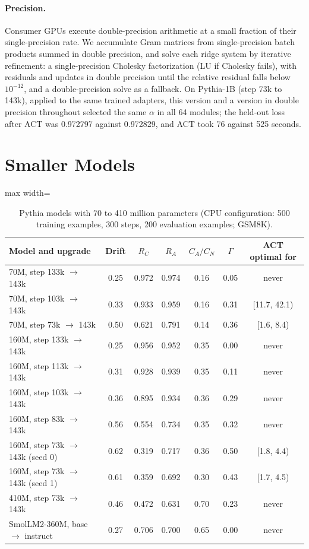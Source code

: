 \documentclass[preprint,12pt,authoryear]{elsarticle}
\begin{document}
\paragraph{Precision.} Consumer GPUs execute double-precision arithmetic at a small fraction of their single-precision rate. We accumulate Gram matrices from single-precision batch products summed in double precision, and solve each ridge system by iterative refinement: a single-precision Cholesky factorization (LU if Cholesky fails), with residuals and updates in double precision until the relative residual falls below $10^{-12}$, and a double-precision solve as a fallback. On Pythia-1B (step 73k to 143k), applied to the same trained adapters, this version and a version in double precision throughout selected the same $\alpha$ in all 64 modules; the held-out loss after ACT was 0.972797 against 0.972829, and ACT took 76 against 525 seconds.

\section{Smaller Models}\label{app:small}

\begin{table}[t]
\centering
\caption{Pythia models with 70 to 410 million parameters (CPU configuration: 500 training examples, 300 steps, 200 evaluation examples; GSM8K).}\label{tab:small}
\small
\begin{adjustbox}{max width=\textwidth}
\begin{tabular}{lcccccc}
\toprule
Model and upgrade & Drift & $R_C$ & $R_A$ & $C_A/C_N$ & $\Gamma$ & ACT optimal for\\
\midrule
70M, step 133k $\to$ 143k & 0.25 & 0.972 & 0.974 & 0.16 & 0.05 & never\\
70M, step 103k $\to$ 143k & 0.33 & 0.933 & 0.959 & 0.16 & 0.31 & [11.7, 42.1)\\
70M, step 73k $\to$ 143k & 0.50 & 0.621 & 0.791 & 0.14 & 0.36 & [1.6, 8.4)\\
160M, step 133k $\to$ 143k & 0.25 & 0.956 & 0.952 & 0.35 & 0.00 & never\\
160M, step 113k $\to$ 143k & 0.31 & 0.928 & 0.939 & 0.35 & 0.11 & never\\
160M, step 103k $\to$ 143k & 0.36 & 0.895 & 0.934 & 0.36 & 0.29 & never\\
160M, step 83k $\to$ 143k & 0.56 & 0.554 & 0.734 & 0.35 & 0.32 & never\\
160M, step 73k $\to$ 143k (seed 0) & 0.62 & 0.319 & 0.717 & 0.36 & 0.50 & [1.8, 4.4)\\
160M, step 73k $\to$ 143k (seed 1) & 0.61 & 0.359 & 0.692 & 0.30 & 0.43 & [1.7, 4.5)\\
410M, step 73k $\to$ 143k & 0.46 & 0.472 & 0.631 & 0.70 & 0.23 & never\\
SmolLM2-360M, base $\to$ instruct & 0.27 & 0.706 & 0.700 & 0.65 & 0.00 & never\\
\bottomrule
\end{tabular}
\end{adjustbox}
\end{table}
\end{document}
